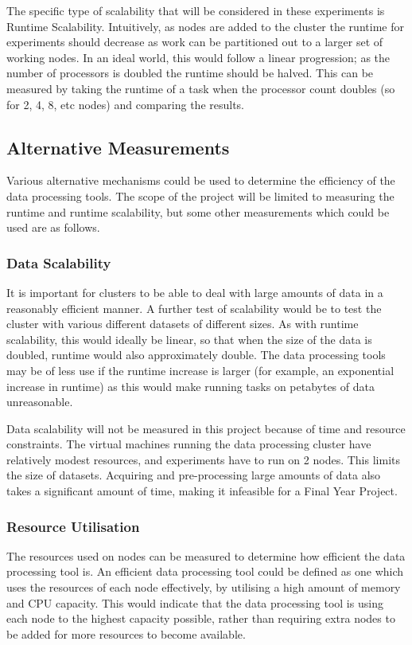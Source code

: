 The specific type of scalability that will be considered in these experiments is Runtime Scalability. Intuitively, as nodes are added to the cluster the runtime for experiments should decrease as work can be partitioned out to a larger set of working nodes. In an ideal world, this would follow a linear progression; as the number of processors is doubled the runtime should be halved. This can be measured by taking the runtime of a task when the processor count doubles (so for 2, 4, 8, etc nodes) and comparing the results.

\subsection{Alternative Measurements}
Various alternative mechanisms could be used to determine the efficiency of the data processing tools. The scope of the project will be limited to measuring the runtime and runtime scalability, but some other measurements which could be used are as follows.

\subsubsection{Data Scalability}
It is important for clusters to be able to deal with large amounts of data in a reasonably efficient manner. A further test of scalability would be to test the cluster with various different datasets of different sizes. As with runtime scalability, this would ideally be linear, so that when the size of the data is doubled, runtime would also approximately double. The data processing tools may be of less use if the runtime increase is larger (for example, an exponential increase in runtime) as this would make running tasks on petabytes of data unreasonable.

Data scalability will not be measured in this project because of time and resource constraints. The virtual machines running the data processing cluster have relatively modest resources, and experiments have to run on 2 nodes. This limits the size of datasets. Acquiring and pre-processing large amounts of data also takes a significant amount of time, making it infeasible for a Final Year Project.

\subsubsection{Resource Utilisation}
The resources used on nodes can be measured to determine how efficient the data processing tool is. An efficient data processing tool could be defined as one which uses the resources of each node effectively, by utilising a high amount of memory and CPU capacity. This would indicate that the data processing tool is using each node to the highest capacity possible, rather than requiring extra nodes to be added for more resources to become available.

